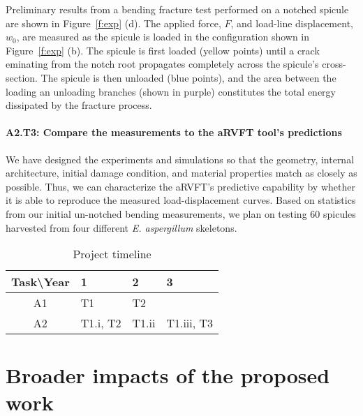 \documentclass[10pt,letterpaper]{article}
\begin{document}
      Preliminary results from a bending fracture test performed on a notched spicule are shown in Figure~\ref{f:exp} (d). The applied force, $F$, and load-line displacement, $w_0$, are measured as the spicule is loaded in the configuration shown in Figure~\ref{f:exp} (b). The spicule is first loaded (yellow points) until a crack eminating from the notch root propagates completely across the spicule's cross-section. The spicule is then unloaded (blue points), and the area between the loading an unloading branches (shown in purple) constitutes the total energy dissipated by the fracture process.

    \paragraph{A2.T3: Compare the measurements to the aRVFT tool's predictions}
      We have designed the experiments and simulations so that the geometry, internal architecture, initial damage condition, and material properties match as closely as possible. Thus, we can characterize the aRVFT's predictive capability by whether it is able to reproduce the measured load-displacement curves. Based on statistics from our initial un-notched bending measurements, we plan on testing 60 spicules harvested from four different \textit{E. aspergillum} skeletons.

      \begin{table}[H]
        \center
        \caption{Project timeline}
        \label{t:timeline}
        \begin{tabular}{clll}
          \hline
          Task\textbackslash Year & 1 &  2 &  3 \\
          \hline
          A1 & T1 & T2 &  \\
          A2 & T1.i, T2 & T1.ii & T1.iii, T3 \\
          \hline
        \end{tabular}
      \end{table}

\section{Broader impacts of the proposed work}
  \label{s:broaderimp}
\end{document}
